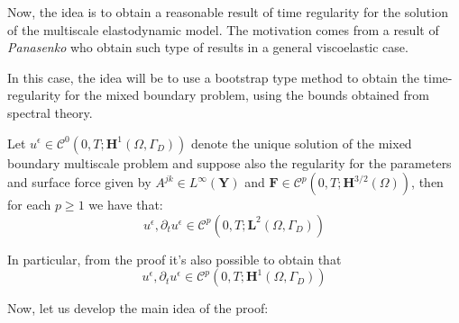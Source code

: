 
Now, the idea is to obtain a reasonable result of time regularity for the solution of the multiscale elastodynamic model. The motivation comes from a result of \textit{Panasenko} who obtain such type of results in a general viscoelastic case.

In this case, the idea will be to use a bootstrap type method to obtain the time-regularity for the mixed boundary problem, using the bounds obtained from spectral theory.

\begin{prop}
Let $u^{\epsilon} \in \mathcal{C}^{0}(0,T; \mathbf{H}^1(\Omega, \Gamma_D))$ denote the unique solution of the mixed boundary multiscale problem and suppose also the regularity for the parameters and surface force given by $A^{jk} \in L^{\infty}(\mathbf{Y})$ and $\mathbf{F} \in \mathcal{C}^p(0,T; \mathbf{H}^{3/2}(\Omega))$, then for each $p \geq 1$ we have that:
\begin{equation*}
    u^{\epsilon}, \partial_t u^{\epsilon} \in \mathcal{C}^p(0,T; \mathbf{L}^2(\Omega, \Gamma_D))
\end{equation*}
\end{prop}
\begin{rem}
In particular, from the proof it's also possible to obtain that
\begin{equation*}
    u^{\epsilon}, \partial_t u^{\epsilon} \in \mathcal{C}^p(0,T; \mathbf{H}^1(\Omega, \Gamma_D))
\end{equation*}
\end{rem}
Now, let us develop the main idea of the proof:\\
